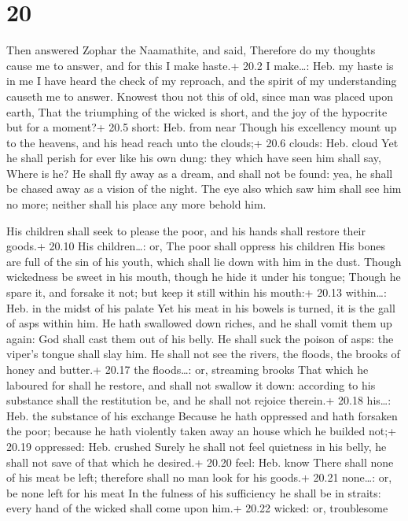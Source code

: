 \hypertarget{section-19}{%
\section{20}\label{section-19}}

 Then answered Zophar the Naamathite, and said, 
Therefore do my thoughts cause me to answer, and for this I make haste.+
20.2 I make\ldots: Heb. my haste is in me  I have heard the
check of my reproach, and the spirit of my understanding causeth me to
answer.  Knowest thou not this of old, since man was placed
upon earth,  That the triumphing of the wicked is short, and
the joy of the hypocrite but for a moment?+ 20.5 short: Heb. from near
 Though his excellency mount up to the heavens, and his head
reach unto the clouds;+ 20.6 clouds: Heb. cloud  Yet he
shall perish for ever like his own dung: they which have seen him shall
say, Where is he?  He shall fly away as a dream, and shall
not be found: yea, he shall be chased away as a vision of the night.
 The eye also which saw him shall see him no more; neither
shall his place any more behold him.

 His children shall seek to please the poor, and his hands
shall restore their goods.+ 20.10 His children\ldots: or, The poor shall
oppress his children  His bones are full of the sin of his
youth, which shall lie down with him in the dust.  Though
wickedness be sweet in his mouth, though he hide it under his tongue;
 Though he spare it, and forsake it not; but keep it still
within his mouth:+ 20.13 within\ldots: Heb. in the midst of his palate
 Yet his meat in his bowels is turned, it is the gall of
asps within him.  He hath swallowed down riches, and he
shall vomit them up again: God shall cast them out of his belly.
 He shall suck the poison of asps: the viper's tongue shall
slay him.  He shall not see the rivers, the floods, the
brooks of honey and butter.+ 20.17 the floods\ldots: or, streaming
brooks  That which he laboured for shall he restore, and
shall not swallow it down: according to his substance shall the
restitution be, and he shall not rejoice therein.+ 20.18 his\ldots: Heb.
the substance of his exchange  Because he hath oppressed
and hath forsaken the poor; because he hath violently taken away an
house which he builded not;+ 20.19 oppressed: Heb. crushed 
Surely he shall not feel quietness in his belly, he shall not save of
that which he desired.+ 20.20 feel: Heb. know  There shall
none of his meat be left; therefore shall no man look for his goods.+
20.21 none\ldots: or, be none left for his meat  In the
fulness of his sufficiency he shall be in straits: every hand of the
wicked shall come upon him.+ 20.22 wicked: or, troublesome

